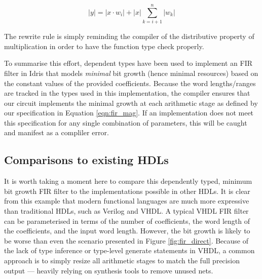 \documentclass[conference]{IEEEtran}
\begin{document}
\begin{equation}
|y| = |x\cdot w_i|+|x|\sum_{k=i+1}^{n} |w_k|
\end{equation}

The rewrite rule is simply reminding the compiler of the distributive property
of multiplication in order to have the function type check properly.

To summarise this effort, dependent types have been used to implement an FIR
filter in Idris that models \emph{minimal} bit growth (hence minimal resources)
based on the constant values of the provided coefficients. Because the word
lengths/ranges are tracked in the types used in this implementation, the
compiler ensures that our circuit implements the minimal growth at each
arithmetic stage as defined by our specification in Equation \ref{eqn:fir_mag}.
If an implementation does not meet this specification for any single combination
of parameters, this will be caught and manifest as a compliler error.


\subsection{Comparisons to existing HDLs}


It is worth taking a moment here to compare this dependently typed, minimum bit
growth FIR filter to the implementations possible in other HDLs. It is clear
from this example that modern functional languages are much more expressive than
traditional HDLs, such as Verilog and VHDL. A typical VHDL FIR filter can be
parameterised in terms of the number of coefficients, the word length of the
coefficients, and the input word length. However, the bit growth is likely to be
worse than even the scenario presented in Figure \ref{fig:fir_direct}. Because
of the lack of type inference or type-level generate statements in VHDL, a
common approach is to simply resize all arithmetic stages to match the full
precision output --- heavily relying on synthesis tools to remove unused nets.
\end{document}
